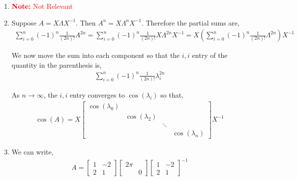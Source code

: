 \documentclass[10pt]{article}
\newcommand{\note}[1]{\textcolor{red}{\textbf{Note:} #1}}
\begin{document}
\begin{solution}[Solution]
\begin{enumerate}[label=(\alph*)]
    \item \note{Not Relevant} 
    \item Suppose \( A = X\Lambda X^{-1} \). Then \( A^n = X\Lambda^nX^{-1} \). Therefore the partial sums are,
        \begin{align*}
            \sum_{i=0}^{n} (-1)^n \frac{1}{(2n)!} A^{2n}
            =\sum_{i=0}^{n} (-1)^n \frac{1}{(2n)!} X\Lambda^{2n}X^{-1}
            = X \left(\sum_{i=0}^{n} (-1)^n \frac{1}{(2n)!} \Lambda^{2n} \right)X^{-1}
        \end{align*}
        
        We now move the sum into each component so that the \( i,i \) entry of the quantity in the parenthesis is,
        \begin{align*}
            \sum_{i=0}^{n} (-1)^n \frac{1}{(2n)!} \lambda_i^{2n}
        \end{align*}
        
        As \( n\to\infty \), the \( i,i \) entry converges to \( \cos(\lambda_i) \) so that,
        \begin{align*}
            \cos(A) = X \left[\begin{array}{rrrr}\cos(\lambda_0) \\ & \cos(\lambda_2) \\ & & \ddots\\ & & & \cos( \lambda_n) \end{array}\right]X^{-1}
        \end{align*}
        

    \item
        We can write,
        \begin{align*}
            A = \left[\begin{array}{rr}1 & -2 \\ 2 & 1\end{array}\right]
                \left[\begin{array}{rr}2\pi \\ & 0\end{array}\right]
                \left[\begin{array}{rr}1 & -2 \\ 2 & 1\end{array}\right]^{-1}
        \end{align*}
        

\end{enumerate}
\end{solution}
\end{document}
